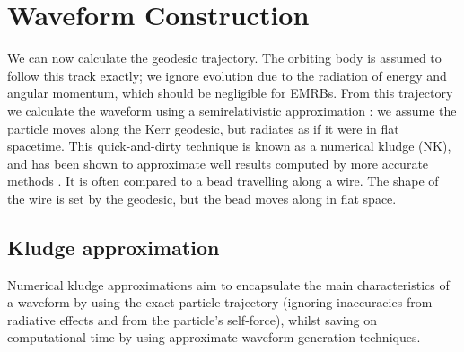 \documentclass[useAMS,usedcolumn,usegraphicx,usenatbib]{mn2e}
\begin{document}
\section{Waveform Construction}\label{sec:Kludge}

We can now calculate the geodesic trajectory. The orbiting body is assumed to follow this track exactly; we ignore evolution due to the radiation of energy and angular momentum, which should be negligible for EMRBs. From this trajectory we calculate the waveform using a semirelativistic approximation \citep{Ruffini1981}: we assume the particle moves along the Kerr geodesic, but radiates as if it were in flat spacetime. This quick-and-dirty technique is known as a numerical kludge (NK), and has been shown to approximate well results computed by more accurate methods \citep{Babak2007}. It is often compared to a bead travelling along a wire. The shape of the wire is set by the geodesic, but the bead moves along in flat space.

\subsection{Kludge approximation}

Numerical kludge approximations aim to encapsulate the main characteristics of a waveform by using the exact particle trajectory (ignoring inaccuracies from radiative effects and from the particle's self-force), whilst saving on computational time by using approximate waveform generation techniques.
\end{document}
